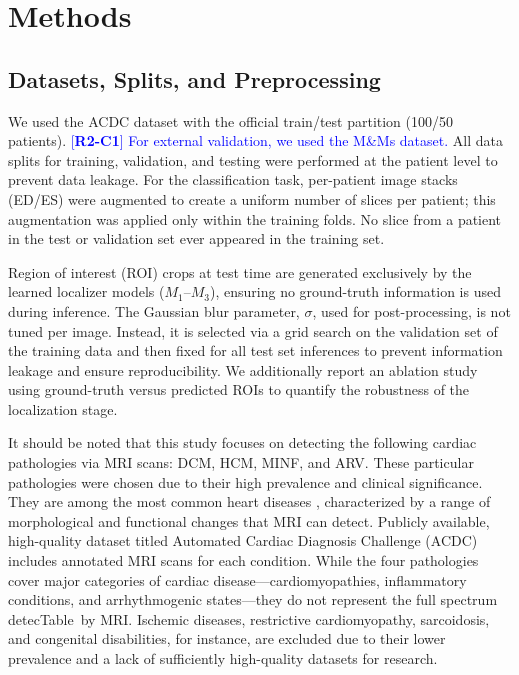 \documentclass[fleqn,10pt]{wlscirep}
\newcommand{\revtag}[2]{[\textbf{R#1-C#2}]}
\newcommand{\Rtwo}[1]{\textcolor{blue}{#1}}
\begin{document}
\section*{Methods}

\subsection*{Datasets, Splits, and Preprocessing}
We used the ACDC dataset\cite{Bernard:2018} with the official train/test partition (100/50 patients). \Rtwo{\revtag{2}{1} For external validation, we used the M\&Ms dataset\cite{Campello:2021}.} All data splits for training, validation, and testing were performed at the patient level to prevent data leakage. For the classification task, per-patient image stacks (ED/ES) were augmented to create a uniform number of slices per patient; this augmentation was applied only within the training folds. No slice from a patient in the test or validation set ever appeared in the training set.

Region of interest (ROI) crops at test time are generated exclusively by the learned localizer models ($M_1$--$M_3$), ensuring no ground-truth information is used during inference. The Gaussian blur parameter, $\sigma$, used for post-processing, is not tuned per image. Instead, it is selected via a grid search on the validation set of the training data and then fixed for all test set inferences to prevent information leakage and ensure reproducibility. We additionally report an ablation study using ground-truth versus predicted ROIs to quantify the robustness of the localization stage.

It should be noted that this study focuses on detecting the following cardiac pathologies via MRI scans: DCM, HCM, MINF, and ARV. These particular pathologies were chosen due to their high prevalence and clinical significance. They are among the most common heart diseases \cite{Wang:2023,McKenna:2017}, characterized by a range of morphological and functional changes that MRI can detect. Publicly available, high-quality dataset titled Automated Cardiac Diagnosis Challenge (ACDC) \cite{Bernard:2018} includes annotated MRI scans for each condition. While the four pathologies cover major categories of cardiac disease---cardiomyopathies, inflammatory conditions, and arrhythmogenic states---they do not represent the full spectrum detecTable~by MRI. Ischemic diseases, restrictive cardiomyopathy, sarcoidosis, and congenital disabilities, for instance, are excluded due to their lower prevalence and a lack of sufficiently high-quality datasets for research.
\end{document}

